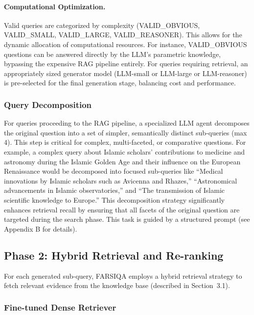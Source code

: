 \documentclass[11pt]{article}
\begin{document}
\paragraph{Computational Optimization.}
Valid queries are categorized by complexity (VALID\_OBVIOUS, VALID\_SMALL, VALID\_LARGE, VALID\_REASONER). This allows for the dynamic allocation of computational resources. For instance, VALID\_OBVIOUS questions can be answered directly by the LLM's parametric knowledge, bypassing the expensive RAG pipeline entirely. For queries requiring retrieval, an appropriately sized generator model (LLM-small or LLM-large or LLM-reasoner) is pre-selected for the final generation stage, balancing cost and performance. \cite{fairrag}

\subsubsection{Query Decomposition}

For queries proceeding to the RAG pipeline, a specialized LLM agent decomposes the original question into a set of simpler, semantically distinct sub-queries (max 4). This step is critical for complex, multi-faceted, or comparative questions. For example, a complex query about Islamic scholars' contributions to medicine and astronomy during the Islamic Golden Age and their influence on the European Renaissance would be decomposed into focused sub-queries like ``Medical innovations by Islamic scholars such as Avicenna and Rhazes,'' ``Astronomical advancements in Islamic observatories,'' and ``The transmission of Islamic scientific knowledge to Europe.'' This decomposition strategy significantly enhances retrieval recall by ensuring that all facets of the original question are targeted during the search phase. \cite{fairrag} This task is guided by a structured prompt (see Appendix B for details).

\subsection{Phase 2: Hybrid Retrieval and Re-ranking}

For each generated sub-query, FARSIQA employs a hybrid retrieval strategy to fetch relevant evidence from the knowledge base (described in Section~3.1).

\subsubsection{Fine-tuned Dense Retriever}
\end{document}
